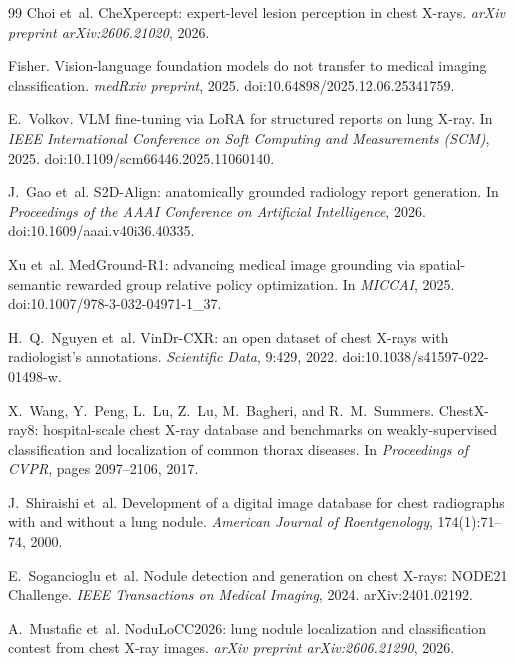 {\begin{thebibliography}{99}
Choi et~al.
\newblock CheXpercept: expert-level lesion perception in chest X-rays.
\newblock \emph{arXiv preprint arXiv:2606.21020}, 2026.

Fisher.
\newblock Vision-language foundation models do not transfer to medical imaging classification.
\newblock \emph{medRxiv preprint}, 2025. doi:10.64898/2025.12.06.25341759.

E.~Volkov.
\newblock VLM fine-tuning via LoRA for structured reports on lung X-ray.
\newblock In \emph{IEEE International Conference on Soft Computing and Measurements (SCM)}, 2025. doi:10.1109/scm66446.2025.11060140.

J.~Gao et~al.
\newblock S2D-Align: anatomically grounded radiology report generation.
\newblock In \emph{Proceedings of the AAAI Conference on Artificial Intelligence}, 2026. doi:10.1609/aaai.v40i36.40335.

Xu et~al.
\newblock MedGround-R1: advancing medical image grounding via spatial-semantic rewarded group relative policy optimization.
\newblock In \emph{MICCAI}, 2025. doi:10.1007/978-3-032-04971-1\_37.

H.~Q.~Nguyen et~al.
\newblock VinDr-CXR: an open dataset of chest X-rays with radiologist's annotations.
\newblock \emph{Scientific Data}, 9:429, 2022. doi:10.1038/s41597-022-01498-w.

X.~Wang, Y.~Peng, L.~Lu, Z.~Lu, M.~Bagheri, and R.~M.~Summers.
\newblock ChestX-ray8: hospital-scale chest X-ray database and benchmarks on weakly-supervised classification and localization of common thorax diseases.
\newblock In \emph{Proceedings of CVPR}, pages 2097--2106, 2017.

J.~Shiraishi et~al.
\newblock Development of a digital image database for chest radiographs with and without a lung nodule.
\newblock \emph{American Journal of Roentgenology}, 174(1):71--74, 2000.

E.~Sogancioglu et~al.
\newblock Nodule detection and generation on chest X-rays: NODE21 Challenge.
\newblock \emph{IEEE Transactions on Medical Imaging}, 2024. arXiv:2401.02192.

A.~Mustafic et~al.
\newblock NoduLoCC2026: lung nodule localization and classification contest from chest X-ray images.
\newblock \emph{arXiv preprint arXiv:2606.21290}, 2026.


\end{thebibliography}}
